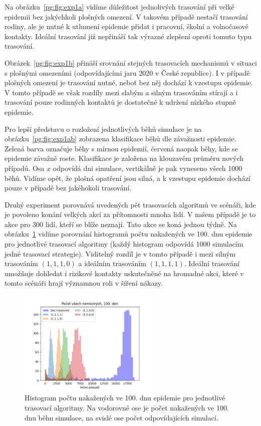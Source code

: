 Na obrázku~\ref{pg:fig:exp1a} vidíme důležitost jednolivých trasování při
velké epidemii bez jakýchkoli plošných omezení. V takovém případě
nestačí trasování rodiny, ale je nutné k utlumení epidemie přidat i
pracovní, školní a volnočasové kontakty. Ideální trasování již
nepřináší tak výrazné zlepšení oproti tomuto typu trasování.

Obrázek~\ref{pg:fig:exp1b} přináší srovnání stejných trasovacích
mechanismů v situaci s plošnými omezeními (odpovídajícími jaru 2020 v
České republice). I v případě plošných omezení je trasování nutné,
neboť bez něj dochází k vzestupu epidemie. V tomto případě
se však rozdíly mezi slabým a silným trasováním stírají a i trasování
pouze rodinných kontaktů je dostatečné k udržení nízkého stupně epidemie. 

Pro lepší představu o rozložení jednotlivých běhů simulace je na
obrázku~\ref{pg:fig:exp1ab} zobrazena klasifikace běhů dle závažnosti
epidemie. Zelená barva označuje běhy s mírnou epidemií, červená naopak běhy,
kde se epidemie závažně roste. Klasifikace je založena na klouzavém průměru
nových případů.  Osa $x$ odpovídá dni simulace, vertikálně je pak vyneseno
všech 1000 běhů. Vidíme opět, že plošná opatření jsou silná, a k vzestupu
epidemie dochází pouze v případě bez jakéhokoli trasování. 


Druhý experiment porovnává uvedených pět trasovacích algoritmů ve
scénáři, kde je povoleno konání velkých akcí za přítomnosti mnoha
lidí.  V našem případě je to akce pro 300 lidí, kteří se blíže
neznají.  Tato akce se koná jednou týdně. Na obrázku~\ref{pg:fig:exp2}
vidíme porovnání histogramů počtu nakažených ve 100. dnu epidemie pro
jednotlivé trasovací algoritmy (každý histogram odpovídá 1000
simulacím jedné trasovací strategie). Viditelný rozdíl je v tomto
případě i mezi silným trasováním $(1, 1, 1, 0)$ a ideálním trasováním
$(1, 1, 1, 1)$. Ideální trasování umožňuje dohledat i rizikové
kontakty uskutečněné na hromadné akci, které v tomto scénáři hrají
významnou roli v šíření nákazy.

\begin{figure}[ht!]
  \centering
  \includegraphics[width=0.6\textwidth]{pic/histogram_party2.png}
  \caption{Histogram  počtu nakažených ve 100. dnu epidemie pro jednotlivé trasovací algoritmy.
  Na vodorovné ose je  počet  nakažených ve 100. dnu běhu simulace, na svislé ose počet odpovídajících simulací.}
  \label{pg:fig:exp2}
\end{figure}




